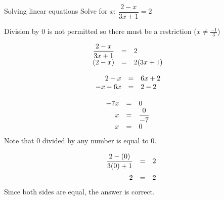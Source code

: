 \begin{wex}{Solving linear equations }
{Solve for $x$: $\dfrac{2-x}{3x+1}=2$} 
{
Division by $0$ is not permitted so there must be a restriction ($x\neq \frac{-1}{3}$)

\begin{equation*}
    \begin{array}{ccll}\hfill \dfrac{2-x}{3x+1}& =& 2\hfill & \\
	\hfill (2-x)& =& 2(3x+1)\hfill & \\ 
    \end{array}
\end{equation*}

\begin{equation*}
    \begin{array}{ccll}
	\hfill 2-x& =& 6x+2\hfill & \hfill \\ 
	\hfill -x-6x& =& 2-2\hfill & \hfill \\ 
    \end{array}
\end{equation*}

\begin{equation*}
    \begin{array}{ccll}
	\hfill -7x& =& 0\hfill & \hfill \\
	\hfill x& =& \dfrac{0}{-7}\hfill & \\
	\hfill x& =& 0\hfill & \hfill 
    \end{array}
\end{equation*}
Note that $0$ divided by any number is equal to $0$.


\begin{equation*}
    \begin{array}{ccc}\hfill \dfrac{2-(0)}{3(0)+1}& =& 2\hfill \vspace{6pt}\\
	\hfill 2& =& 2\hfill 
\end{array}
\end{equation*}
Since both sides are equal, the answer is correct.
}
\end{wex}


